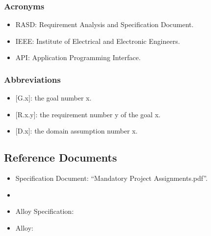 \subsubsection{Acronyms}
\renewcommand{\labelitemi}{$-$}
\begin{itemize}
\item
RASD: Requirement Analysis and Specification Document.
\item
IEEE: Institute of Electrical and Electronic Engineers.
\item
API: Application Programming Interface.
\end{itemize}

\subsubsection{Abbreviations}
\renewcommand{\labelitemi}{$-$}
\begin{itemize}
\item
$[$G.x$]$: the goal number x.
\item
$[$R.x.y$]$: the requirement number y of the goal x.
\item
$[$D.x$]$: the domain assumption number x.
\end{itemize}

\subsection{Reference Documents}
\renewcommand{\labelitemi}{$-$}
\begin{itemize}
\item
Specification Document: “Mandatory Project Assignments.pdf”.
\item
\href{http://ieeexplore.ieee.org/servlet/opac?punumber=6146377}{\color{Black}{IEEE Std 29148-2011 - ISO/IEC/IEEE International Standard - Systems and software engineering.}}
\item
Alloy Specification:\href{http://alloy.mit.edu/alloy/}{\color{Black}{"Software Abstractation", Daniel Jackson.}}
\item
Alloy:\href{http://tmancini.di.uniroma1.it/teaching/courses/2007-2008/mfis/materiale/progetti/Pagliaro\%20-\%20Alloy.relazione.pdf}{\color{Black}{"Alloy e l'Analyzer versione 4.0", "Alessandro Pagliaro"}}

\end{itemize}

